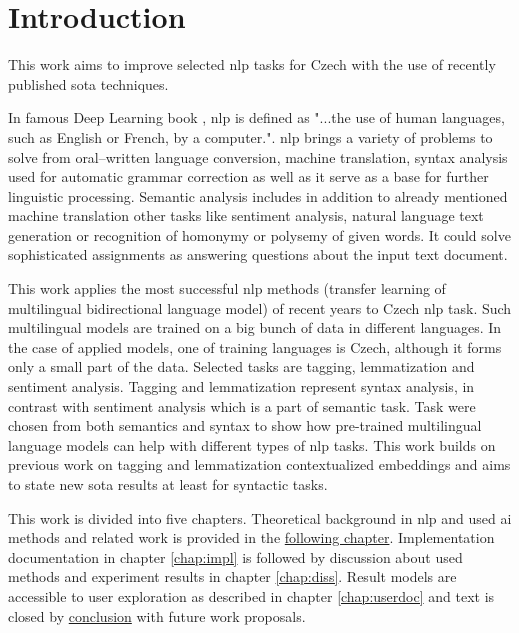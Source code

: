 \chapter*{Introduction}

This work aims to improve selected \gls{nlp} tasks for Czech with the use of recently published \gls{sota} techniques. 
 
In famous Deep Learning book \citep{Goodfellow-et-al-2016}, \gls{nlp} is defined as "...the use of human languages, such as English or French, by a computer.". \gls{nlp} brings a variety of problems to solve from oral--written language conversion, machine translation, syntax analysis used for automatic grammar correction as well as it serve as a base for further linguistic processing. Semantic analysis includes in addition to already mentioned machine translation other tasks like sentiment analysis, natural language text generation or recognition of homonymy or polysemy of given words. It could solve sophisticated assignments as answering questions about the input text document.
\par

This work applies the most successful \gls{nlp} methods (transfer learning of multilingual bidirectional language model) of recent years to Czech \gls{nlp} task. Such multilingual models are trained on a big bunch of data in different languages. In the case of applied models, one of training languages is Czech, although it forms only a small part of the data. %
Selected tasks are tagging, lemmatization and sentiment analysis. Tagging and lemmatization represent syntax analysis, in contrast with sentiment analysis which is a part of semantic task. %
Task were chosen from both semantics and syntax to show how pre-trained multilingual language models can help with different types of \gls{nlp} tasks. This work builds on previous work on tagging and lemmatization contextualized embeddings \citep{straka2019czech} and aims to state new \gls{sota} results at least for syntactic tasks.
\par
This work is divided into five chapters. Theoretical background in \gls{nlp} and used \gls{ai} methods and related work is provided in the \hyperref[chap:theandme]{following chapter}.
Implementation documentation in chapter \ref{chap:impl} is followed by discussion about used methods and experiment results in chapter \ref{chap:diss}. Result models are accessible to user exploration as described in chapter \ref{chap:userdoc} and text is closed by \hyperref[chap:concl]{conclusion} with future work proposals.


